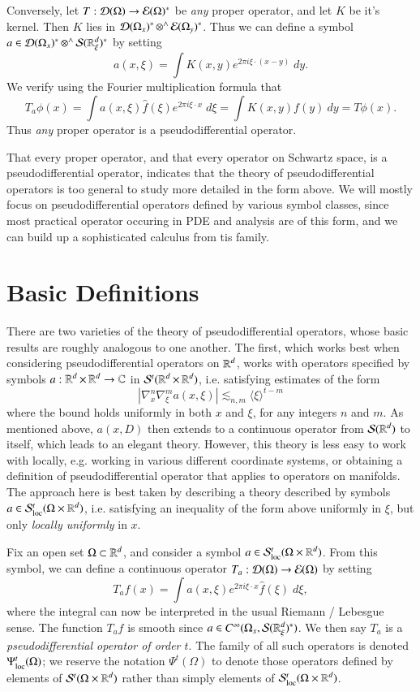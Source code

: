 \begin{itemize}
    Conversely, let $T: \operatorname{\mathcal{D}}(\Omega) \to \operatorname{\mathcal{E}}(\Omega)^*$ be \emph{any} proper operator, and let $K$ be it's kernel. Then $K$ lies in $\operatorname{\mathcal{D}}(\Omega_x)^* \operatorname{{{\otimes}^\wedge}} \operatorname{\mathcal{E}}(\Omega_y)^*$. Thus we can define a symbol $a \in \operatorname{\mathcal{D}}(\Omega_x)^* \operatorname{{{\otimes}^\wedge}} \operatorname{\mathcal{S}}(\operatorname{\mathbb{R}}^d_\xi)^*$ by setting
    \[ a(x,\xi) = \int K(x,y) e^{2 \pi i \xi \cdot (x - y)}\; dy. \]
    We verify using the Fourier multiplication formula that
    \[ T_a \phi(x) = \int a(x,\xi) \widehat{f}(\xi) e^{2 \pi i \xi \cdot x}\; d\xi = \int K(x,y) f(y)\ dy = T\phi(x). \]
    Thus \emph{any} proper operator is a pseudodifferential operator.
\end{itemize}
%
That every proper operator, and that every operator on Schwartz space, is a pseudodifferential operator, indicates that the theory of pseudodifferential operators is too general to study more detailed in the form above. We will mostly focus on pseudodifferential operators defined by various symbol classes, since most practical operator occuring in PDE and analysis are of this form, and we can build up a sophisticated calculus from tis family.

\section{Basic Definitions}

There are two varieties of the theory of pseudodifferential operators, whose basic results are roughly analogous to one another. The first, which works best when considering pseudodifferential operators on $\operatorname{\mathbb{R}}^d$, works with operators specified by symbols $a: \operatorname{\mathbb{R}}^d \times \operatorname{\mathbb{R}}^d \to \operatorname{\mathbb{C}}$ in $\mathcal{S}^t(\operatorname{\mathbb{R}}^d \times \operatorname{\mathbb{R}}^d)$, i.e. satisfying estimates of the form
%
\[ |\nabla^n_x \nabla^m_\xi a(x,\xi)| \lesssim_{n,m} \langle \xi \rangle^{t-m} \]
%
where the bound holds uniformly in both $x$ and $\xi$, for any integers $n$ and $m$. As mentioned above, $a(x,D)$ then extends to a continuous operator from $\operatorname{\mathcal{S}}(\operatorname{\mathbb{R}}^d)$ to itself, which leads to an elegant theory. However, this theory is less easy to work with locally, e.g. working in various different coordinate systems, or obtaining a definition of pseudodifferential operator that applies to operators on manifolds. The approach here is best taken by describing a theory described by symbols $a \in \mathcal{S}^t_{\text{loc}}(\Omega \times \operatorname{\mathbb{R}}^d)$, i.e. satisfying an inequality of the form above uniformly in $\xi$, but only \emph{locally uniformly} in $x$.

Fix an open set $\Omega \subset \operatorname{\mathbb{R}}^d$, and consider a symbol $a \in \mathcal{S}^t_{\text{loc}}(\Omega \times \operatorname{\mathbb{R}}^d)$. From this symbol, we can define a continuous operator $T_a: \operatorname{\mathcal{D}}(\Omega) \to \operatorname{\mathcal{E}}(\Omega)$ by setting
%
\[ T_a f(x) = \int a(x,\xi) e^{2 \pi i \xi \cdot x} \widehat{f}(\xi)\; d\xi, \]
%
where the integral can now be interpreted in the usual Riemann / Lebesgue sense. The function $T_a f$ is smooth since $a \in C^\infty(\Omega_x, \operatorname{\mathcal{S}}(\operatorname{\mathbb{R}}^d_\xi)^*)$. We then say $T_a$ is a \emph{pseudodifferential operator of order $t$}. The family of all such operators is denoted $\Psi^t_{\text{loc}}(\Omega)$; we reserve the notation $\Psi^t(\Omega)$ to denote those operators defined by elements of $\mathcal{S}^t(\Omega \times \operatorname{\mathbb{R}}^d)$ rather than simply elements of $\mathcal{S}^t_{\text{loc}}(\Omega \times \operatorname{\mathbb{R}}^d)$.

